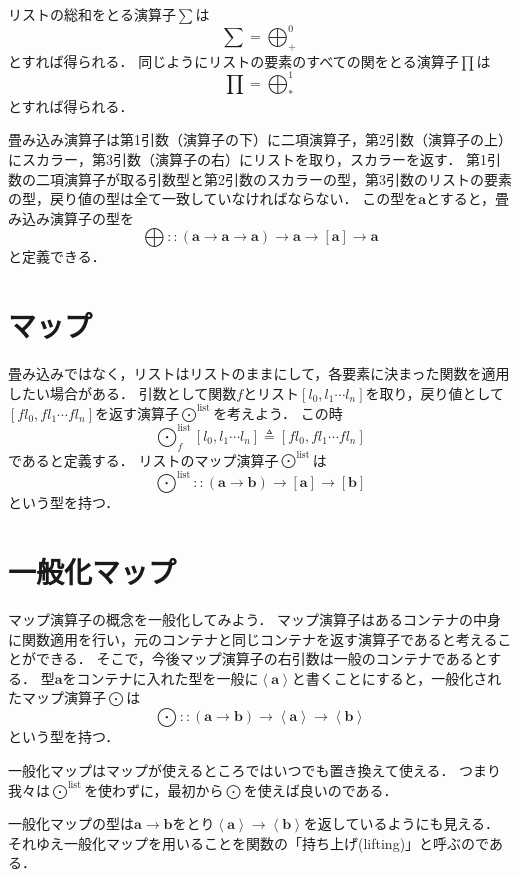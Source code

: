 \documentclass[twocolumn]{jsbook}
\newcommand{\foldfunc}{\bigoplus}
\newcommand{\mapfunc}{\bigodot}
\newcommand{\typename}[1]{\bm{#1}}
\newcommand{\generalcontainer}[1]{\left\langle#1\right\rangle}
\newcommand{\listtype}[1]{\left[#1\right]}
\begin{document}
リストの総和をとる演算子$\sum$は$$\sum=\foldfunc_+^0$$とすれば得られる．
同じようにリストの要素のすべての関をとる演算子$\prod$は$$\prod=\foldfunc_\ast^1$$とすれば得られる．

畳み込み演算子は第1引数（演算子の下）に二項演算子，第2引数（演算子の上）にスカラー，第3引数（演算子の右）にリストを取り，スカラーを返す．
第1引数の二項演算子が取る引数型と第2引数のスカラーの型，第3引数のリストの要素の型，戻り値の型は全て一致していなければならない．
この型を$\typename{a}$とすると，畳み込み演算子の型を$$\foldfunc::(\typename{a}\rightarrow\typename{a}\rightarrow\typename{a})\rightarrow\typename{a}\rightarrow\listtype{\typename{a}}\rightarrow\typename{a}$$と定義できる．


\section{マップ}

畳み込みではなく，リストはリストのままにして，各要素に決まった関数を適用したい場合がある．
引数として関数$f$とリスト$[l_0,l_1\dotsb l_n]$を取り，戻り値として$[fl_0,fl_1\dotsb fl_n]$を返す演算子$\mapfunc^\text{list}$を考えよう．
この時$$\mapfunc_f^\text{list}[l_0,l_1\dotsb l_n]\triangleq [fl_0,fl_1\dotsb fl_n]$$であると定義する．
リストのマップ演算子$\mapfunc^\text{list}$は$$\mapfunc^\text{list}::(\typename{a}\rightarrow\typename{b})\rightarrow\listtype{\typename{a}}\rightarrow\listtype{\typename{b}}$$という型を持つ．


\section{一般化マップ}

マップ演算子の概念を一般化してみよう．
マップ演算子はあるコンテナの中身に関数適用を行い，元のコンテナと同じコンテナを返す演算子であると考えることができる．
そこで，今後マップ演算子の右引数は一般のコンテナであるとする．
型$\typename{a}$をコンテナに入れた型を一般に$\generalcontainer{\typename{a}}$と書くことにすると，一般化されたマップ演算子$\mapfunc$は$$\mapfunc::(\typename{a}\rightarrow\typename{b})\rightarrow\generalcontainer{\typename{a}}\rightarrow\generalcontainer{\typename{b}}$$という型を持つ．

一般化マップはマップが使えるところではいつでも置き換えて使える．
つまり我々は$\mapfunc^\text{list}$を使わずに，最初から$\mapfunc$を使えば良いのである．

一般化マップの型は$\typename{a}\rightarrow\typename{b}$をとり$\generalcontainer{\typename{a}}\rightarrow\generalcontainer{\typename{b}}$を返しているようにも見える．
それゆえ一般化マップを用いることを関数の「持ち上げ(lifting)」と呼ぶのである．
\end{document}

